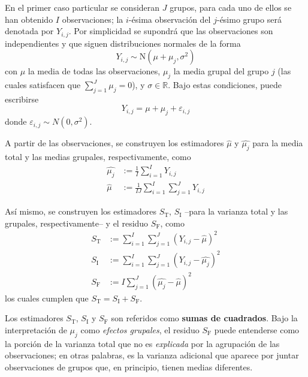\documentclass[12pt,letterpaper]{book}
\newcommand{\R}{\mathbb{R}}
\begin{document}
En el primer caso particular se consideran $J$ grupos, para cada uno de ellos se han obtenido $I$ observaciones; la $i$-ésima observación del $j$-ésimo grupo será denotada por $Y_{i,j}$.
%
Por simplicidad se supondrá que las observaciones son independientes y que siguen distribuciones normales de la forma 
\begin{equation}
Y_{i,j} \sim \text{N}(\mu+\mu_j, \sigma^2)
\end{equation}
con $\mu$ la media de todas las observaciones, $\mu_j$ la media grupal del grupo $j$ (las cuales satisfacen que $\sum_{j = 1}^J \mu_j = 0$), y $\sigma\in \R$.
%
Bajo estas condiciones, puede escribirse
\begin{equation}
Y_{i,j} = \mu + \mu_j + \varepsilon_{i,j}
\end{equation}
donde $\varepsilon_{i,j}\sim N(0,\sigma^2)$. 

A partir de las observaciones, se construyen los estimadores $\widehat{\mu}$ y $\widehat{\mu_j}$ para la media total y las medias grupales, respectivamente, como
\begin{align}
\widehat{\mu_j} &{:=}  \frac{1}{I} \sum_{i = 1}^{I} Y_{i,j} \\
\widehat{\mu}   &{:=}  \frac{1}{I J} \sum_{i = 1}^{I} \sum_{j = 1}^{J} Y_{i,j}
\end{align}

Así mismo, se construyen los estimadores $S_{\text{T}}$, $S_{\text{I}}$ --para la varianza total y las grupales, respectivamente-- y el residuo $S_{\text{F}}$, como
\begin{align}
S_{\text{T}}  &{:=} \sum_{i = 1}^{I} \sum_{j = 1}^{J} \left( Y_{i,j} - \widehat{\mu} \right)^2 \\
S_{\text{I}} &{:=} \sum_{i = 1}^{I} \sum_{j = 1}^{J} \left( Y_{i,j} - \widehat{\mu_j} \right)^2 \\
S_{\text{F}} &{:=} I \sum_{j = 1}^{J} \left( \widehat{\mu_j} - \widehat{\mu} \right)^2
\end{align}
los cuales cumplen que $S_{\text{T}} = S_{\text{I}} + S_{\text{F}}$.

Los estimadores $S_{\text{T}}$, $S_{\text{I}}$ y $S_{\text{F}}$ son referidos como \textbf{sumas de cuadrados}. 
%
Bajo la interpretación de $\mu_j$ como \textit{efectos grupales}, el residuo $S_{\text{F}}$ puede entenderse como la porción de la varianza total que no es \textit{explicada} por la agrupación de las observaciones; en otras palabras, es la varianza adicional que aparece por juntar observaciones de grupos que, en principio, tienen medias diferentes.
\end{document}

